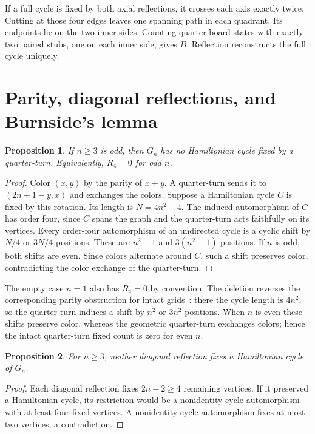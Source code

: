 \documentclass[12pt]{amsart}
\newtheorem{proposition}{Proposition}
\begin{document}
If a full cycle is fixed by both axial reflections, it crosses each axis
exactly twice. Cutting at those four edges leaves one spanning path in each
quadrant. Its endpoints lie on the two inner sides. Counting quarter-board
states with exactly two paired stubs, one on each inner side, gives $B$.
Reflection reconstructs the full cycle uniquely.

\section{Parity, diagonal reflections, and Burnside's lemma}
\label{sec:burnside}
\begin{proposition}\label{prop:parity}
If $n\geq3$ is odd, then $G_n$ has no Hamiltonian cycle fixed by a
quarter-turn. Equivalently, $R_4=0$ for odd $n$.
\end{proposition}
\begin{proof}
Color $(x,y)$ by the parity of $x+y$. A quarter-turn sends it to
$(2n+1-y,x)$ and exchanges the colors. Suppose a Hamiltonian cycle $C$
is fixed by this rotation. Its length is $N=4n^2-4$.
The induced automorphism of $C$ has order four, since $C$ spans the graph
and the quarter-turn acts faithfully on its vertices. Every order-four
automorphism of an undirected cycle is a cyclic shift by $N/4$ or $3N/4$
positions. These are $n^2-1$ and $3(n^2-1)$ positions. If $n$ is odd,
both shifts are even. Since colors alternate around $C$, such a shift
preserves color, contradicting the color exchange of the quarter-turn.
\end{proof}
The empty case $n=1$ also has $R_4=0$ by convention. The deletion reverses
the corresponding parity obstruction for intact grids~\cite{wynn}:
there the cycle length is $4n^2$, so the quarter-turn induces a shift by
$n^2$ or $3n^2$ positions. When $n$ is even these shifts preserve color,
whereas the geometric quarter-turn exchanges colors; hence the intact
quarter-turn fixed count is zero for even $n$.

\begin{samepage}
\begin{proposition}\label{prop:diagonal}
For $n\geq3$, neither diagonal reflection fixes a Hamiltonian cycle of $G_n$.
\end{proposition}
\begin{proof}
Each diagonal reflection fixes $2n-2\geq4$ remaining vertices. If it
preserved a Hamiltonian cycle, its restriction would be a nonidentity
cycle automorphism with at least four fixed vertices. A nonidentity cycle
automorphism fixes at most two vertices, a contradiction.
\end{proof}
\end{samepage}
\end{document}
